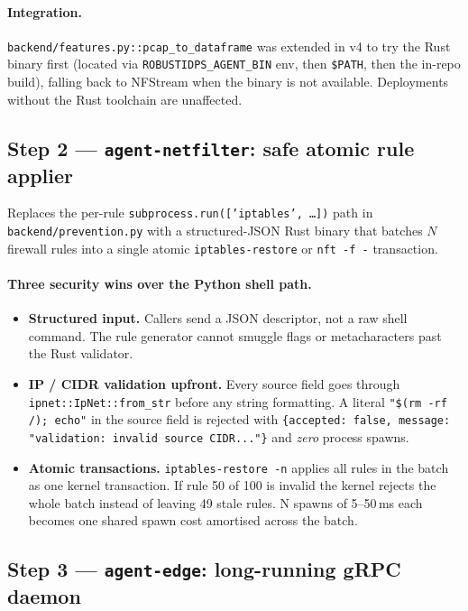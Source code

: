 \documentclass[11pt,a4paper]{article}
\begin{document}
\paragraph{Integration.}
\texttt{backend/features.py::pcap\_to\_dataframe} was extended in v4 to
try the Rust binary first (located via \texttt{ROBUSTIDPS\_AGENT\_BIN}
env, then \texttt{\$PATH}, then the in-repo build), falling back to
NFStream when the binary is not available.  Deployments without the
Rust toolchain are unaffected.

\subsection{Step 2 --- \texttt{agent-netfilter}: safe atomic rule applier}

Replaces the per-rule
\texttt{subprocess.run(['iptables', \ldots])} path in
\texttt{backend/prevention.py} with a structured-JSON Rust binary
that batches \(N\) firewall rules into a single atomic
\texttt{iptables-restore} or \texttt{nft -f -} transaction.

\paragraph{Three security wins over the Python shell path.}

\begin{itemize}[nosep,leftmargin=*]
  \item \textbf{Structured input.}  Callers send a JSON descriptor,
        not a raw shell command.  The rule generator cannot smuggle
        flags or metacharacters past the Rust validator.
  \item \textbf{IP / CIDR validation upfront.}  Every source field
        goes through \texttt{ipnet::IpNet::from\_str} before any
        string formatting.  A literal \texttt{"\$(rm -rf /); echo"}
        in the source field is rejected with
        \texttt{\{accepted: false, message: "validation: invalid source
        CIDR..."\}} and \emph{zero} process spawns.
  \item \textbf{Atomic transactions.}
        \texttt{iptables-restore -n} applies all rules in the batch
        as one kernel transaction.  If rule 50 of 100 is invalid the
        kernel rejects the whole batch instead of leaving 49 stale
        rules.  N spawns of 5--50\,ms each becomes one shared spawn
        cost amortised across the batch.
\end{itemize}

\subsection{Step 3 --- \texttt{agent-edge}: long-running gRPC daemon}
\end{document}
